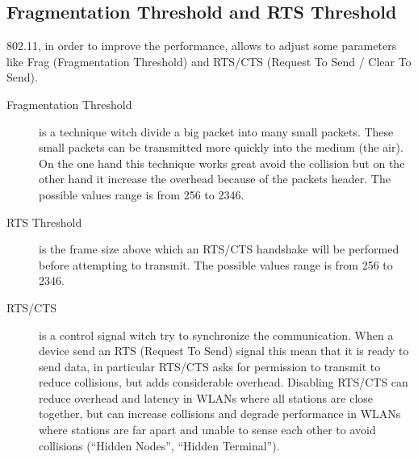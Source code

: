 	
	\subsection{Fragmentation Threshold and RTS Threshold} \label{theory:frag_rts}
	
	802.11, in order to improve the performance, allows to adjust some parameters like Frag (Fragmentation Threshold) and RTS/CTS (Request To Send / Clear To Send).
	
	\begin{description}
		\item[Fragmentation Threshold] is a technique witch divide a big packet into many small packets. These small packets can be transmitted more quickly into the medium (the air). On the one hand this technique works great avoid the collision but on the other hand it increase the overhead because of the packets header. The possible values range is from 256 to 2346.
	
		\item[RTS Threshold] is the frame size above which an RTS/CTS handshake will be performed before attempting to transmit. The possible values range is from 256 to 2346.
	
		\item[RTS/CTS] is a control signal witch try to synchronize the communication. When a device send an RTS (Request To Send) signal this mean that it is ready to send data, in particular RTS/CTS asks for permission to transmit to reduce collisions, but adds considerable overhead. Disabling RTS/CTS can reduce overhead and latency in WLANs where all stations are close together, but can increase collisions and degrade performance in WLANs where stations are far apart and unable to sense each other to avoid collisions (``Hidden Nodes'', ``Hidden Terminal'').
	\end{description}


	








